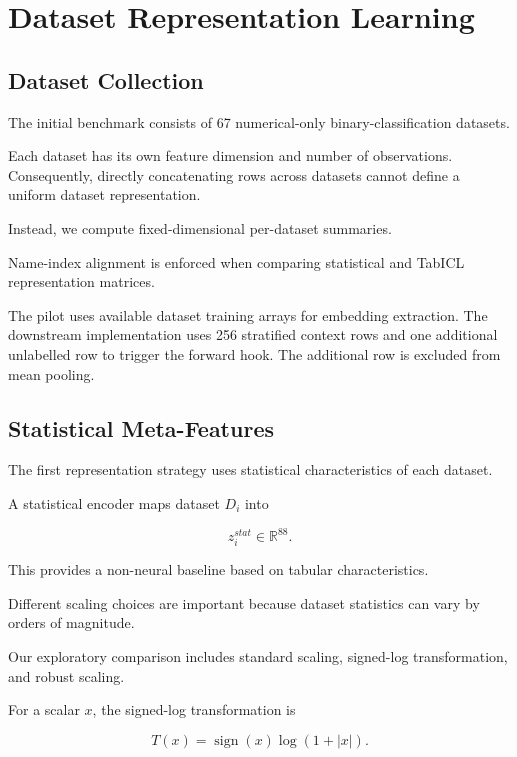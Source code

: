 \documentclass[conference]{IEEEtran}
\begin{document}
\section{Dataset Representation Learning}

\subsection{Dataset Collection}

The initial benchmark consists of 67 numerical-only binary-classification datasets.

Each dataset has its own feature dimension and number of observations. Consequently, directly concatenating rows across datasets cannot define a uniform dataset representation.

Instead, we compute fixed-dimensional per-dataset summaries.

Name-index alignment is enforced when comparing statistical and TabICL representation matrices.

The pilot uses available dataset training arrays for embedding extraction. The downstream implementation uses 256 stratified context rows and one additional unlabelled row to trigger the forward hook. The additional row is excluded from mean pooling.

\subsection{Statistical Meta-Features}

The first representation strategy uses statistical characteristics of each dataset.

A statistical encoder maps dataset $D_i$ into

\begin{equation}
z_i^{stat}\in\mathbb{R}^{88}.
\end{equation}

This provides a non-neural baseline based on tabular characteristics.

Different scaling choices are important because dataset statistics can vary by orders of magnitude.

Our exploratory comparison includes standard scaling, signed-log transformation, and robust scaling.

For a scalar $x$, the signed-log transformation is

\begin{equation}
T(x)=\operatorname{sign}(x)\log(1+|x|).
\end{equation}
\end{document}
